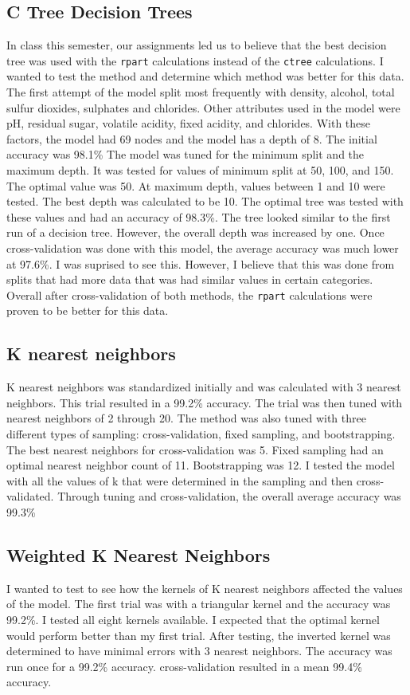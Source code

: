 \documentclass[letterpaper]{article}\usepackage[]{graphicx}\usepackage[]{color}
\begin{document}
\subsection*{C Tree Decision Trees}
In class this semester, our assignments led us to believe that the best decision tree was used with the \texttt{rpart} calculations instead of the \texttt{ctree} calculations.  I wanted to test the method and determine which method was better for this data. The first attempt of the model split most frequently with density, alcohol, total sulfur dioxides, sulphates and chlorides. Other attributes used in the model were pH, residual sugar, volatile acidity, fixed acidity, and chlorides. With these factors, the model had 69 nodes and the model has a depth of 8. The initial accuracy was 98.1\% The model was tuned for the minimum split and the maximum depth. It was tested for values of minimum split at 50, 100, and 150. The optimal value was 50. At maximum depth, values between 1 and 10 were tested. The best depth was calculated to be 10. The optimal tree was tested with these values and had an accuracy of 98.3\%.  The tree looked similar to the first run of a decision tree. However, the overall depth was increased by one. Once cross-validation was done with this model, the average accuracy was much lower at 97.6\%. I was suprised to see this. However, I believe that this was done from splits that had more data that was had similar values in certain categories. Overall after cross-validation of both methods, the \texttt{rpart} calculations were proven to be better for this data.

\subsection*{K nearest neighbors}
K nearest neighbors was standardized initially and was calculated with 3 nearest neighbors. This trial resulted in a 99.2\% accuracy. The trial was then tuned with nearest neighbors of 2 through 20. The method was also tuned with three different  types of sampling: cross-validation, fixed sampling, and bootstrapping. The best nearest neighbors for cross-validation was 5. Fixed sampling had an optimal nearest neighbor count of 11. Bootstrapping was 12. I tested the model with all the values of k that were determined in the sampling and then cross-validated. Through tuning and cross-validation, the overall average accuracy was 99.3\%

\subsection*{Weighted K Nearest Neighbors}
I wanted to test to see how the kernels of K nearest neighbors affected the values of the model. The first trial was with a triangular kernel and the accuracy was 99.2\%. I tested all eight kernels available. I expected that the optimal kernel would perform better than my first trial. After testing, the inverted kernel was determined to have minimal errors with 3 nearest neighbors. The accuracy was run once for a 99.2\% accuracy. cross-validation resulted in a mean 99.4\% accuracy.
\end{document}
